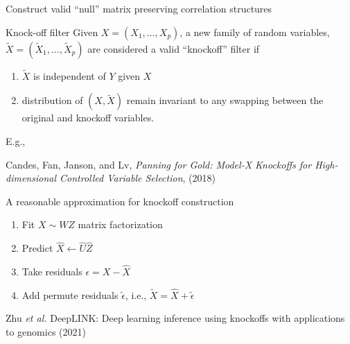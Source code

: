 \documentclass[
  ignorenonframetext,
  aspectratio=169]{beamer}
\begin{document}
\begin{frame}{Construct valid ``null'' matrix preserving correlation
structures}
\protect\hypertarget{construct-valid-null-matrix-preserving-correlation-structures}{}
\begin{block}{Knock-off filter}
\protect\hypertarget{knock-off-filter}{}
Given \(X = (X_{1},\ldots, X_{p})\), a new family of random variables,
\(\tilde{X} = (\tilde{X}_{1},\ldots, \tilde{X}_{p})\) are considered a
valid ``knockoff'' filter if

\begin{enumerate}
\item
  \(\tilde{X}\) is independent of \(Y\) given \(X\)
\item
  distribution of \((X, \tilde{X})\) remain invariant to any swapping
  between the original and knockoff variables.
\end{enumerate}
\end{block}

E.g.,


\vfill

\tiny

Candes, Fan, Janson, and Lv, \emph{Panning for Gold: Model-X Knockoffs
for High-dimensional Controlled Variable Selection}, (2018)
\end{frame}

\begin{frame}{}
\protect\hypertarget{section-2}{}
\end{frame}

\begin{frame}{A reasonable approximation for knockoff construction}
\protect\hypertarget{a-reasonable-approximation-for-knockoff-construction}{}
\Large
\begin{enumerate}
\item<1-> Fit $X \sim W Z$ matrix factorization
\item<2-> Predict $\hat{X} \gets \hat{U} \hat{Z}$
\item<3-> Take residuals $\epsilon = X - \hat{X}$
\item<4-> Add permute residuals $\tilde{\epsilon}$, i.e., $\tilde{X} = \hat{X} + \tilde{\epsilon}$
\end{enumerate}

\vfill

\tiny

Zhu \emph{et al.} DeepLINK: Deep learning inference using knockoffs with
applications to genomics (2021)
\end{frame}
\end{document}
